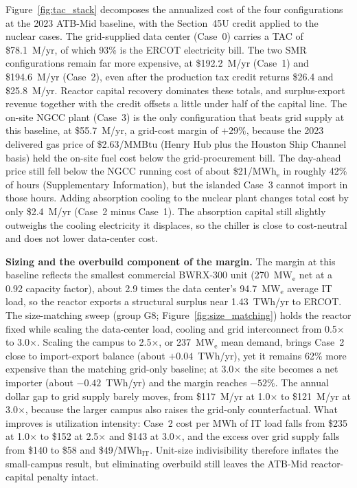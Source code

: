 \documentclass[a4paper,fleqn]{cas-sc}
\newcommand{\runinhead}[1]{\par\smallskip\noindent\textbf{#1.}\quad}
\begin{document}
Figure~\ref{fig:tac_stack} decomposes the annualized cost of the four configurations at the 2023 ATB-Mid baseline, with the Section~45U credit applied to the nuclear cases. The grid-supplied data center (Case~0) carries a TAC of \$78.1~M/yr, of which 93\% is the ERCOT electricity bill. The two SMR configurations remain far more expensive, at \$192.2~M/yr (Case~1) and \$194.6~M/yr (Case~2), even after the production tax credit returns \$26.4 and \$25.8~M/yr. Reactor capital recovery dominates these totals, and surplus-export revenue together with the credit offsets a little under half of the capital line. The on-site NGCC plant (Case~3) is the only configuration that beats grid supply at this baseline, at \$55.7~M/yr, a grid-cost margin of $+29\%$, because the 2023 delivered gas price of \$2.63/MMBtu (Henry Hub plus the Houston Ship Channel basis) held the on-site fuel cost below the grid-procurement bill. The day-ahead price still fell below the NGCC running cost of about \$21/MWh$_\mathrm{e}$ in roughly 42\% of hours (Supplementary Information), but the islanded Case~3 cannot import in those hours. Adding absorption cooling to the nuclear plant changes total cost by only \$2.4~M/yr (Case~2 minus Case~1). The absorption capital still slightly outweighs the cooling electricity it displaces, so the chiller is close to cost-neutral and does not lower data-center cost.

\runinhead{Sizing and the overbuild component of the margin}
The margin at this baseline reflects the smallest commercial BWRX-300 unit (270~MW$_\mathrm{e}$ net at a 0.92 capacity factor), about 2.9 times the data center's 94.7~MW$_\mathrm{e}$ average IT load, so the reactor exports a structural surplus near 1.43~TWh/yr to ERCOT. The size-matching sweep (group G8; Figure~\ref{fig:size_matching}) holds the reactor fixed while scaling the data-center load, cooling and grid interconnect from 0.5$\times$ to 3.0$\times$. Scaling the campus to 2.5$\times$, or 237~MW$_\mathrm{e}$ mean demand, brings Case~2 close to import-export balance (about $+0.04$~TWh/yr), yet it remains 62\% more expensive than the matching grid-only baseline; at 3.0$\times$ the site becomes a net importer (about $-0.42$~TWh/yr) and the margin reaches $-52\%$. The annual dollar gap to grid supply barely moves, from \$117~M/yr at 1.0$\times$ to \$121~M/yr at 3.0$\times$, because the larger campus also raises the grid-only counterfactual. What improves is utilization intensity: Case~2 cost per MWh of IT load falls from \$235 at 1.0$\times$ to \$152 at 2.5$\times$ and \$143 at 3.0$\times$, and the excess over grid supply falls from \$140 to \$58 and \$49/MWh$_\mathrm{IT}$. Unit-size indivisibility therefore inflates the small-campus result, but eliminating overbuild still leaves the ATB-Mid reactor-capital penalty intact.
\end{document}
